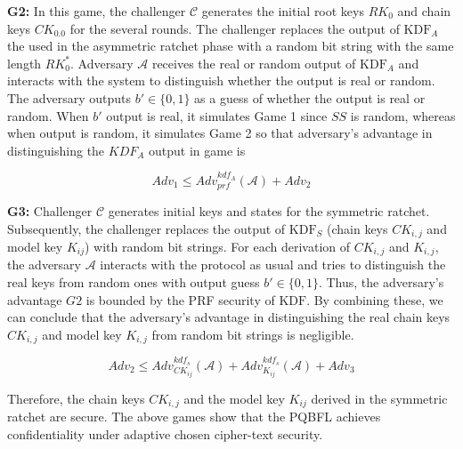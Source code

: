 \documentclass[a4paper,fleqn]{cas-dc}
\begin{document}
\textbf{G2:}  In this game, the challenger $\mathcal{C}$ generates the initial root keys $RK_{0}$ and chain keys $CK_{0.0}$ for the several rounds. 
The challenger replaces the output of $\text{KDF}_{A}$ the used in the asymmetric ratchet phase with a random bit string with the same length $RK^{*}_{0}$.
Adversary $\mathcal{A}$ receives the real or random output of $\text{KDF}_{A}$ and interacts with the system to distinguish whether the output is real or random. 
The adversary outputs $b'\in \{0,1\}$ as a guess of whether the output is real or random. 
When $b'$ output is real, it simulates Game 1 since $SS$ is random, whereas when output is random, it simulates Game 2 so that adversary's advantage in distinguishing the $KDF_{A}$ output in game is

$$
    Adv_{1} \leq Adv_{prf}^{kdf_{A}}(\mathcal{A})+ Adv_{2}
$$




\textbf{G3:} 
Challenger $\mathcal{C}$ generates initial keys and states for the symmetric ratchet. 
Subsequently, the challenger replaces the output of $\text{KDF}_{S}$ (chain keys $CK_{i,j}$ and model key $K_{ij}$) with random bit strings. 
For each derivation of $CK_{i,j}$ and $K_{i,j}$, the adversary $\mathcal{A}$  interacts with the protocol as usual and tries to distinguish the real keys from random ones with output guess $b' \in \{0,1\}$. 
Thus, the adversary's advantage $G2$ is bounded by the PRF security of $\text{KDF}$. 
By combining these, we can conclude that the adversary's advantage in distinguishing the real chain keys $CK_{i,j}$ and model key $K_{i,j}$ from random bit strings is negligible.

$$
    Adv_{2} \leq Adv_{CK_{ij}}^{kdf_{s}}(\mathcal{A})+ Adv_{K_{ij}}^{kdf_{s}}(\mathcal{A})+ Adv_{3}
$$

Therefore, the chain keys $CK_{i,j}$ and the model key $K_{ij}$ derived in the symmetric ratchet are secure. The above games show that the PQBFL achieves confidentiality under adaptive chosen cipher-text security.
\end{document}
